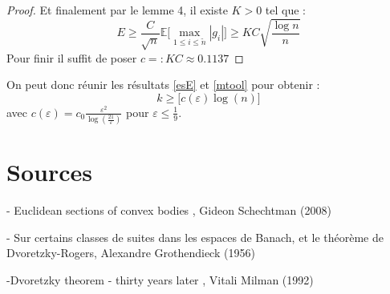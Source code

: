 \documentclass[12pt]{article}
\begin{document}
\begin{proof}
	Et finalement par le lemme 4, il existe $K>0$ tel que :
	\begin{equation*}
		E\geq \frac{C}{\sqrt{n}} \mathbb{E}\big[\max_{1\leq i \leq \tilde{n}}|g_i|\big]\geq KC\sqrt{\frac{\log n}{n}}
	\end{equation*}
	Pour finir il suffit de poser $c=: KC \approx 0.1137$
\end{proof}

On peut donc réunir les résultats \ref{esE} et \ref{mtool} pour obtenir :
\begin{equation*}
	k \geq \big[c(\varepsilon)\log(n)\big]
\end{equation*}
avec $c(\varepsilon)= c_0 \frac{\varepsilon^2}{\log(\frac{21}{\varepsilon})}$ pour $\varepsilon\leq \frac{1}{9}$.
\newpage

\section*{Sources}

- Euclidean sections of convex bodies , Gideon Schechtman (2008)

- Sur certains classes de suites dans les espaces de Banach, et le théorème de Dvoretzky-Rogers, Alexandre Grothendieck (1956) 

-Dvoretzky theorem - thirty years later , Vitali Milman (1992)
\end{document}
